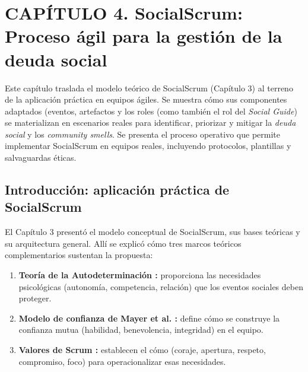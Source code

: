 ﻿\usetikzlibrary{positioning}

\chapter*{CAPÍTULO 4. SocialScrum: Proceso ágil para la gestión de la deuda social}
\setcounter{chapter}{4}
\setcounter{section}{0}
\setcounter{subsection}{0}
\setcounter{subsubsection}{0}
\renewcommand{\thesection}{\thechapter.\arabic{section}}
\renewcommand{\thesubsection}{\thesection.\arabic{subsection}}
\renewcommand{\thesubsubsection}{\thesubsection.\arabic{subsubsection}}

Este capítulo traslada el modelo teórico de SocialScrum (Capítulo 3) al terreno de la aplicación práctica en equipos ágiles. Se muestra cómo sus componentes adaptados (eventos, artefactos y los roles (como también el rol del \textit{Social Guide}) se materializan en escenarios reales para identificar, priorizar y mitigar la \textit{deuda social} y los \textit{community smells}. Se presenta el proceso operativo que permite implementar SocialScrum en equipos reales, incluyendo protocolos, plantillas y salvaguardas éticas.

\section{Introducción: aplicación práctica de SocialScrum}

El Capítulo 3 presentó el modelo conceptual de SocialScrum, sus bases teóricas y su arquitectura general. Allí se explicó cómo tres marcos teóricos complementarios sustentan la propuesta:

\begin{enumerate}
    \item \textbf{Teoría de la Autodeterminación \cite{bandura1997selfefficacy}:} proporciona las necesidades psicológicas (autonomía, competencia, relación) que los eventos sociales deben proteger.
    \item \textbf{Modelo de confianza de Mayer et al. \cite{mayer1995integrative}:} define cómo se construye la confianza mutua (habilidad, benevolencia, integridad) en el equipo.
    \item \textbf{Valores de Scrum \cite{schwaber2020scrum}:} establecen el cómo (coraje, apertura, respeto, compromiso, foco) para operacionalizar esas necesidades.
\end{enumerate}

